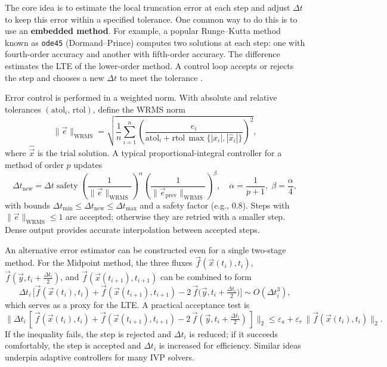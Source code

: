 The core idea is to estimate the local truncation error at each step and adjust $\Delta t$ to keep this error within a specified tolerance. One common way to do this is to use an \textbf{embedded method}. For example, a popular Runge--Kutta method known as \texttt{ode45} (Dormand--Prince) computes two solutions at each step: one with fourth-order accuracy and another with fifth-order accuracy. The difference estimates the LTE of the lower-order method. A control loop accepts or rejects the step and chooses a new $\Delta t$ to meet the tolerance \cite{DormandPrince1980,ShampineReichelt1997}.

Error control is performed in a weighted norm. With absolute and relative tolerances $(\mathrm{atol}_i,\,\mathrm{rtol})$, define the WRMS norm
\begin{equation}
    \|\vec{e}\|_{\mathrm{WRMS}} = \sqrt{\frac{1}{n}\sum_{i=1}^n \left(\frac{e_i}{\mathrm{atol}_i + \mathrm{rtol}\,\max\{ |x_i|, |\hat{x}_i|\}}\right)^2},
\end{equation}
where $\hat{\vec{x}}$ is the trial solution. A typical proportional-integral controller for a method of order $p$ updates
\begin{equation}
    \Delta t_{\mathrm{new}} = \Delta t\;\mathrm{safety}\;\left(\frac{1}{\|\vec{e}\|_{\mathrm{WRMS}}}\right)^{\alpha}\left(\frac{1}{\|\vec{e}_{\mathrm{prev}}\|_{\mathrm{WRMS}}}\right)^{\beta},\quad \alpha=\frac{1}{p+1},\; \beta=\frac{\alpha}{4},
\end{equation}
with bounds $\Delta t_{\min}\le \Delta t_{\mathrm{new}}\le \Delta t_{\max}$ and a safety factor (e.g., 0.8). Steps with $\|\vec{e}\|_{\mathrm{WRMS}}\le 1$ are accepted; otherwise they are retried with a smaller step. Dense output provides accurate interpolation between accepted steps.

An alternative error estimator can be constructed even for a single two-stage method. For the Midpoint method, the three fluxes $\vec{f}(\vec{x}(t_i),t_i)$, $\vec{f}(\vec{y},t_i+\tfrac{\Delta t_i}{2})$, and $\vec{f}(\vec{x}(t_{i+1}),t_{i+1})$ can be combined to form
\begin{equation}
    \Delta t_i\,\Big[\vec{f}(\vec{x}(t_i),t_i) + \vec{f}(\vec{x}(t_{i+1}),t_{i+1}) - 2\,\vec{f}\big(\vec{y},t_i+\tfrac{\Delta t_i}{2}\big)\Big] \sim O(\Delta t_i^3),
\end{equation}
which serves as a proxy for the LTE. A practical acceptance test is
\begin{equation}
    \big\|\Delta t_i\,[\,\vec{f}(\vec{x}(t_i),t_i) + \vec{f}(\vec{x}(t_{i+1}),t_{i+1}) - 2\,\vec{f}(\vec{y},t_i+\tfrac{\Delta t_i}{2})\,]\big\|_2 \le \varepsilon_a + \varepsilon_r\,\big\|\vec{f}(\vec{x}(t_i),t_i)\big\|_2.
\end{equation}
If the inequality fails, the step is rejected and $\Delta t_i$ is reduced; if it succeeds comfortably, the step is accepted and $\Delta t_i$ is increased for efficiency. Similar ideas underpin adaptive controllers for many IVP solvers.

